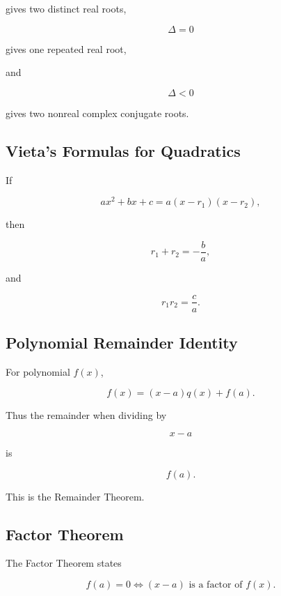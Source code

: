 gives two distinct real roots,

\[
\boxed{
\Delta=0
}
\]

gives one repeated real root,

and

\[
\boxed{
\Delta<0
}
\]

gives two nonreal complex conjugate roots.

\subsection{Vieta's Formulas for Quadratics}
\label{subsec:vieta-quadratic}

If

\[
ax^2+bx+c
=
a(x-r_1)(x-r_2),
\]

then

\[
\boxed{
r_1+r_2
=
-\frac{b}{a},
}
\]

and

\[
\boxed{
r_1r_2
=
\frac{c}{a}.
}
\]

\subsection{Polynomial Remainder Identity}
\label{subsec:polynomial-remainder-identity}

For polynomial \(f(x)\),

\[
\boxed{
f(x)
=
(x-a)q(x)
+
f(a).
}
\]

Thus the remainder when dividing by

\[
x-a
\]

is

\[
\boxed{
f(a).
}
\]

This is the Remainder Theorem.

\subsection{Factor Theorem}
\label{subsec:factor-theorem-reference}

The Factor Theorem states

\[
\boxed{
f(a)=0
\iff
(x-a)\text{ is a factor of }f(x).
}
\]

